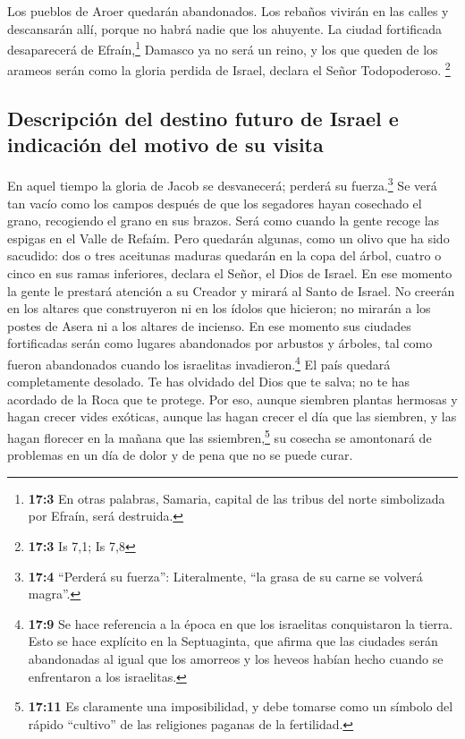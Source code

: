  Los pueblos de Aroer quedarán abandonados. Los rebaños
vivirán en las calles y descansarán allí, porque no habrá nadie que los
ahuyente.  La ciudad fortificada desaparecerá de
Efraín,\footnote{\textbf{17:3} En otras palabras, Samaria, capital de
  las tribus del norte simbolizada por Efraín, será destruida.} Damasco
ya no será un reino, y los que queden de los arameos serán como la
gloria perdida de Israel, declara el Señor Todopoderoso. \footnote{\textbf{17:3}
  Is 7,1; Is 7,8}

\hypertarget{descripciuxf3n-del-destino-futuro-de-israel-e-indicaciuxf3n-del-motivo-de-su-visita}{%
\subsection{Descripción del destino futuro de Israel e indicación del
motivo de su
visita}\label{descripciuxf3n-del-destino-futuro-de-israel-e-indicaciuxf3n-del-motivo-de-su-visita}}

 En aquel tiempo la gloria de Jacob se desvanecerá;
perderá su fuerza.\footnote{\textbf{17:4} ``Perderá su fuerza'':
  Literalmente, ``la grasa de su carne se volverá magra''.}
 Se verá tan vacío como los campos después de que los
segadores hayan cosechado el grano, recogiendo el grano en sus brazos.
Será como cuando la gente recoge las espigas en el Valle de Refaím.
 Pero quedarán algunas, como un olivo que ha sido
sacudido: dos o tres aceitunas maduras quedarán en la copa del árbol,
cuatro o cinco en sus ramas inferiores, declara el Señor, el Dios de
Israel.  En ese momento la gente le prestará atención a su
Creador y mirará al Santo de Israel.  No creerán en los
altares que construyeron ni en los ídolos que hicieron; no mirarán a los
postes de Asera ni a los altares de incienso.  En ese
momento sus ciudades fortificadas serán como lugares abandonados por
arbustos y árboles, tal como fueron abandonados cuando los israelitas
invadieron.\footnote{\textbf{17:9} Se hace referencia a la época en que
  los israelitas conquistaron la tierra. Esto se hace explícito en la
  Septuaginta, que afirma que las ciudades serán abandonadas al igual
  que los amorreos y los heveos habían hecho cuando se enfrentaron a los
  israelitas.} El país quedará completamente desolado. 
Te has olvidado del Dios que te salva; no te has acordado de la Roca que
te protege. Por eso, aunque siembren plantas hermosas y hagan crecer
vides exóticas,  aunque las hagan crecer el día que las
siembren, y las hagan florecer en la mañana que las
ssiembren,\footnote{\textbf{17:11} Es claramente una imposibilidad, y
  debe tomarse como un símbolo del rápido ``cultivo'' de las religiones
  paganas de la fertilidad.} su cosecha se amontonará de problemas en un
día de dolor y de pena que no se puede curar.

